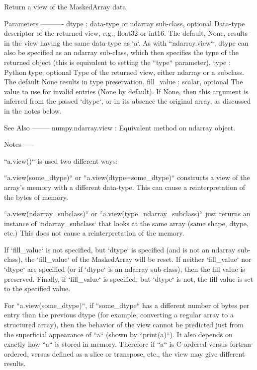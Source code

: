 \begin{DoxyVerb}Return a view of the MaskedArray data.

Parameters
----------
dtype : data-type or ndarray sub-class, optional
    Data-type descriptor of the returned view, e.g., float32 or int16.
    The default, None, results in the view having the same data-type
    as `a`. As with ``ndarray.view``, dtype can also be specified as
    an ndarray sub-class, which then specifies the type of the
    returned object (this is equivalent to setting the ``type``
    parameter).
type : Python type, optional
    Type of the returned view, either ndarray or a subclass.  The
    default None results in type preservation.
fill_value : scalar, optional
    The value to use for invalid entries (None by default).
    If None, then this argument is inferred from the passed `dtype`, or
    in its absence the original array, as discussed in the notes below.

See Also
--------
numpy.ndarray.view : Equivalent method on ndarray object.

Notes
-----

``a.view()`` is used two different ways:

``a.view(some_dtype)`` or ``a.view(dtype=some_dtype)`` constructs a view
of the array's memory with a different data-type.  This can cause a
reinterpretation of the bytes of memory.

``a.view(ndarray_subclass)`` or ``a.view(type=ndarray_subclass)`` just
returns an instance of `ndarray_subclass` that looks at the same array
(same shape, dtype, etc.)  This does not cause a reinterpretation of the
memory.

If `fill_value` is not specified, but `dtype` is specified (and is not
an ndarray sub-class), the `fill_value` of the MaskedArray will be
reset. If neither `fill_value` nor `dtype` are specified (or if
`dtype` is an ndarray sub-class), then the fill value is preserved.
Finally, if `fill_value` is specified, but `dtype` is not, the fill
value is set to the specified value.

For ``a.view(some_dtype)``, if ``some_dtype`` has a different number of
bytes per entry than the previous dtype (for example, converting a
regular array to a structured array), then the behavior of the view
cannot be predicted just from the superficial appearance of ``a`` (shown
by ``print(a)``). It also depends on exactly how ``a`` is stored in
memory. Therefore if ``a`` is C-ordered versus fortran-ordered, versus
defined as a slice or transpose, etc., the view may give different
results.
\end{DoxyVerb}
 

